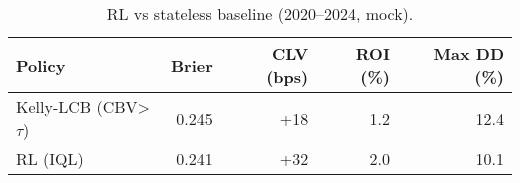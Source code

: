 \begin{table}[t]
  \centering
  \small
  \caption{RL vs stateless baseline (2020–2024, mock).}
  \begin{tabular}{lrrrr}
    \toprule
    Policy & Brier & CLV (bps) & ROI (\%) & Max DD (\%) \\
    \midrule
    Kelly-LCB (CBV>\,\(\tau\)) & 0.245 & +18 & 1.2 & 12.4 \\
    RL (IQL)                     & 0.241 & +32 & 2.0 & 10.1 \\
    \bottomrule
  \end{tabular}
\end{table}
